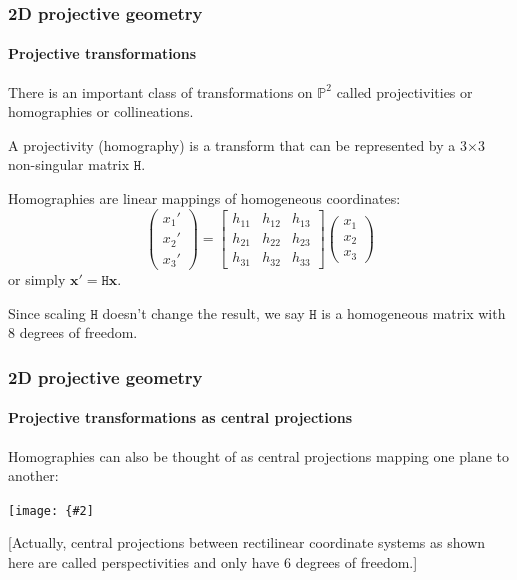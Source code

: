 \documentclass[aspectratio=169]{beamer}
\renewcommand{\vec}[1]{\boldsymbol{#1}}
\newcommand{\mat}[1]{\mathtt{#1}}
\def\Pset{\mathbb{P}}
\newcommand{\myfig}[3]{\centerline{\texttt{[image: \{\#2]}}}
\begin{document}
\begin{frame}
\frametitle{2D projective geometry}
\framesubtitle{Projective transformations}

There is an important class of transformations on $\Pset^2$ called
\alert{projectivities} or \alert{homographies} or
\alert{collineations}.

\medskip

A projectivity (homography) is a transform that can be represented by
a 3$\times$3 non-singular matrix $\mat{H}$.

\medskip

Homographies are \alert{linear mappings} of homogeneous coordinates:
\begin{equation*}
\begin{pmatrix}
x_1' \\ x_2' \\ x_3'
\end{pmatrix} =
\begin{bmatrix}
h_{11} & h_{12} & h_{13} \\
h_{21} & h_{22} & h_{23} \\
h_{31} & h_{32} & h_{33}
\end{bmatrix}
\begin{pmatrix}
x_1 \\ x_2 \\ x_3
\end{pmatrix}
\end{equation*}
or simply $\vec{x}' = \mat{H}\vec{x}$.

\medskip

Since scaling $\mat{H}$ doesn't change the result, we say $\mat{H}$ is
a \alert{homogeneous matrix} with 8 degrees of freedom.

\end{frame}

\begin{frame}
\frametitle{2D projective geometry}
\framesubtitle{Projective transformations as central projections}

Homographies can also be thought of as \alert{central projections}
mapping one plane to another:

\myfig{3in}{HZ-fig1-3}{Hartley and Zisserman (2004), Fig.\ 2.3}

\medskip

[Actually, central projections between rectilinear coordinate systems
as shown here are called \alert{perspectivities} and only have 6
degrees of freedom.]

\end{frame}
\end{document}

